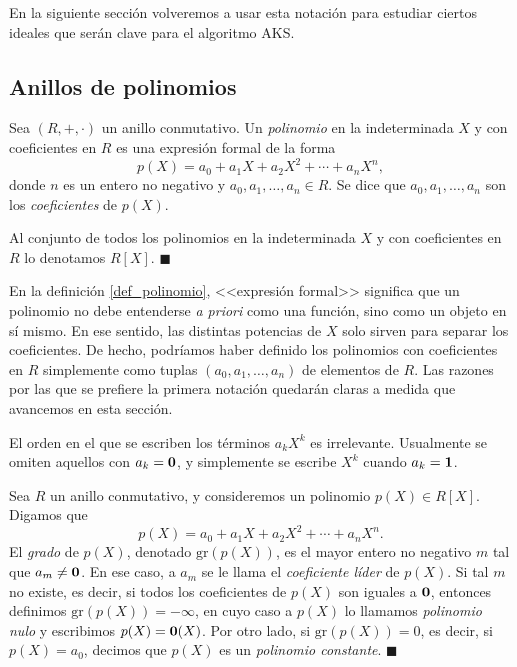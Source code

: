 En la siguiente sección volveremos a usar esta notación para estudiar ciertos ideales que serán clave para el algoritmo AKS.

\subsection{Anillos de polinomios}

\begin{definition} \label{def_polinomio}
Sea $(R, +, \cdot)$ un anillo conmutativo. Un \emph{polinomio} en la indeterminada $X$ y con coeficientes en $R$ es una expresión formal de la forma
$$p(X) = a_0 + a_1X + a_2X^2 + \cdots + a_n X^n,$$
donde $n$ es un entero no negativo y $a_0, a_1, \dots, a_n \in R$. Se dice que $a_0, a_1, \dots, a_n$ son los \emph{coeficientes} de $p(X)$.

Al conjunto de todos los polinomios en la indeterminada $X$ y con coeficientes en $R$ lo denotamos $R[X]$. 
\hfill$\blacksquare$
\end{definition}

En la definición \ref{def_polinomio}, <<expresión formal>> significa que un polinomio no debe entenderse \textit{a priori} como una función, sino como un objeto en sí mismo. En ese sentido, las distintas potencias de $X$ solo sirven para separar los coeficientes. De hecho, podríamos haber definido los polinomios con coeficientes en $R$ simplemente como tuplas $(a_0, a_1, \dots, a_n)$ de elementos de $R$. Las razones por las que se prefiere la primera notación quedarán claras a medida que avancemos en esta sección.

El orden en el que se escriben los términos $a_k X^k$ es irrelevante. Usualmente se omiten aquellos con $a_k=\mathbf{0}$, y simplemente se escribe $X^k$ cuando $a_k = \mathbf{1}$.

\begin{definition}
Sea $R$ un anillo conmutativo, y consideremos un polinomio $p(X) \in R[X]$. Digamos que
$$p(X) = a_0 + a_1X + a_2X^2 + \cdots + a_n X^n.$$
El \emph{grado} de $p(X)$, denotado $\mathrm{gr}(p(X))$, es el mayor entero no negativo $m$ tal que $a_m \neq \mathbf{0}$. En ese caso, a $a_m$ se le llama el \emph{coeficiente líder} de $p(X)$. Si tal $m$ no existe, es decir, si todos los coeficientes de $p(X)$ son iguales a $\mathbf{0}$, entonces definimos $\mathrm{gr}(p(X)) = -\infty$, en cuyo caso a $p(X)$ lo llamamos \emph{polinomio nulo} y escribimos $p(X) = \mathbf{0}(X)$. Por otro lado, si $\mathrm{gr}(p(X)) = 0$, es decir, si $p(X) = a_0$, decimos que $p(X)$ es un \emph{polinomio constante}.
\hfill$\blacksquare$
\end{definition}

